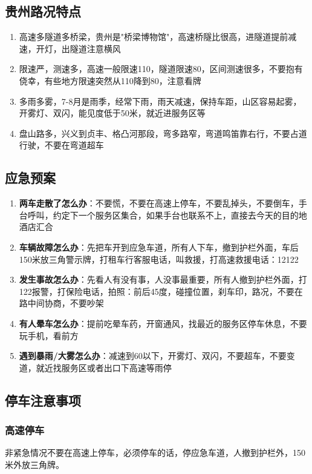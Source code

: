 \documentclass[12pt,a4paper,UTF8]{ctexart}
\begin{document}
\subsection{贵州路况特点}
\begin{enumerate}
\item 高速多隧道多桥梁，贵州是"桥梁博物馆"，高速桥隧比很高，进隧道提前减速，开灯，出隧道注意横风
\item 限速严，测速多，高速一般限速110，隧道限速80，区间测速很多，不要抱有侥幸，有些地方限速突然从110降到80，注意看牌
\item 多雨多雾，7-8月是雨季，经常下雨，雨天减速，保持车距，山区容易起雾，开雾灯、双闪，能见度低于50米，就近进服务区等
\item 盘山路多，兴义到贞丰、格凸河那段，弯多路窄，弯道鸣笛靠右行，不要占道行驶，不要在弯道超车
\end{enumerate}

\subsection{应急预案}
\begin{enumerate}
\item \textbf{两车走散了怎么办}：不要慌，不要在高速上停车，不要乱掉头，不要倒车，手台呼叫，约定下一个服务区集合，如果手台也联系不上，直接去今天的目的地酒店汇合
\item \textbf{车辆故障怎么办}：先把车开到应急车道，所有人下车，撤到护栏外面，车后150米放三角警示牌，打租车行客服电话，叫救援，打高速救援电话：12122
\item \textbf{发生事故怎么办}：先看人有没有事，人没事最重要，所有人撤到护栏外面，打122报警，打保险电话，拍照：前后45度，碰撞位置，刹车印，路况，不要在路中间协商，不要吵架
\item \textbf{有人晕车怎么办}：提前吃晕车药，开窗通风，找最近的服务区停车休息，不要玩手机，看前方
\item \textbf{遇到暴雨/大雾怎么办}：减速到60以下，开雾灯、双闪，不要超车，不要变道，就近找服务区或者出口下高速等雨停
\end{enumerate}

\subsection{停车注意事项}
\subsubsection{高速停车}
非紧急情况不要在高速上停车，必须停车的话，停应急车道，人撤到护栏外，150米外放三角牌。
\end{document}
